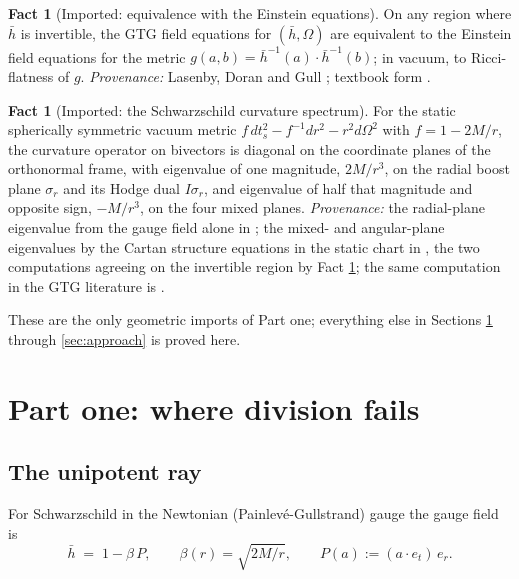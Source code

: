 \documentclass[11pt]{article}
\theoremstyle{definition}
\newtheorem{fact}[theorem]{Fact}
\newcommand{\hb}{\bar{h}}
\newcommand{\er}{e_r}
\newcommand{\et}{e_t}
\begin{document}
\begin{fact}[Imported: equivalence with the Einstein equations]\label{fact:gtg}
On any region where $\hb$ is invertible, the GTG field equations for $(\hb, \Omega)$ are equivalent to the Einstein field equations for the metric $g(a,b) = \hb^{-1}(a)\cdot\hb^{-1}(b)$; in vacuum, to Ricci-flatness of $g$. \emph{Provenance:} Lasenby, Doran and Gull \cite[\S 7]{LDG1998}; textbook form \cite[Ch.~13-14]{DoranLasenby2003}.
\end{fact}

\begin{fact}[Imported: the Schwarzschild curvature spectrum]\label{fact:spectrum}
For the static spherically symmetric vacuum metric $f\,dt_s^2 - f^{-1}dr^2 - r^2 d\Omega^2$ with $f = 1 - 2M/r$, the curvature operator on bivectors is diagonal on the coordinate planes of the orthonormal frame, with eigenvalue of one magnitude, $2M/r^3$, on the radial boost plane $\sigma_r$ and its Hodge dual $I\sigma_r$, and eigenvalue of half that magnitude and opposite sign, $-M/r^3$, on the four mixed planes. \emph{Provenance:} the radial-plane eigenvalue from the gauge field alone in \cite[Prop.~2.4(1)]{ButlerT5}; the mixed- and angular-plane eigenvalues by the Cartan structure equations in the static chart in \cite[App.~A]{ButlerT5}, the two computations agreeing on the invertible region by Fact \ref{fact:gtg}; the same computation in the GTG literature is \cite[Ch.~14]{DoranLasenby2003}.
\end{fact}

These are the only geometric imports of Part one; everything else in Sections \ref{sec:fails} through \ref{sec:approach} is proved here.

\section{Part one: where division fails}\label{sec:fails}

\subsection{The unipotent ray}\label{subsec:unipotent}

For Schwarzschild in the Newtonian (Painlev\'e-Gullstrand) gauge the gauge field is
\begin{equation}\label{eq:hbar}
\hb \;=\; 1 - \beta\,P, \qquad \beta(r) = \sqrt{2M/r}, \qquad P(a) := (a \cdot \et)\,\er .
\end{equation}
\end{document}
